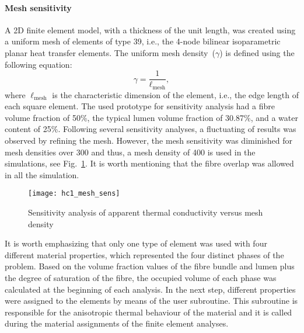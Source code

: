\red
	\paragraph{Mesh sensitivity} A 2D finite element model, with a thickness of the unit length, was created using a uniform mesh of elements of type 39, i.e., the 4-node bilinear isoparametric planar heat transfer elements. The uniform mesh density~($\gamma$) is defined using the following equation:
\begin{equation}
\gamma=\frac{1}{\ell_\text{mesh}},
\end{equation}
	where $\ell_\text{mesh}$ is the characteristic dimension of the element, i.e., the edge length of each square element. The used prototype for sensitivity analysis had a fibre volume fraction of 50\%, the typical lumen volume fraction of 30.87\%, and a water content of 25\%. Following several sensitivity analyses, a fluctuating of results was observed by refining the mesh. However, the mesh sensitivity was diminished for mesh densities over 300 and thus, a mesh density of 400 is used in the simulations, see Fig.~\ref{fig:sensitivty_hc1}. It is worth mentioning that the fibre overlap was allowed in all the simulation.

\begin{figure}[!h]{}
  \centering
	\texttt{[image: hc1\_mesh\_sens]}
  \caption{Sensitivity analysis of apparent thermal conductivity versus mesh density}
  \label{fig:sensitivty_hc1}
\end{figure}
\bl
	
	It is worth emphasizing that only one type of element was used with four different material properties, which represented the four distinct phases of the problem. Based on the volume fraction values of the fibre bundle and lumen plus the degree of saturation of the fibre, the occupied volume of each phase was calculated at the beginning of each analysis. In the next step, different properties were assigned to the elements by means of the  user subroutine. This subroutine is responsible for the anisotropic thermal behaviour of the material and it is called during the material assignments of the finite element analyses.
	
